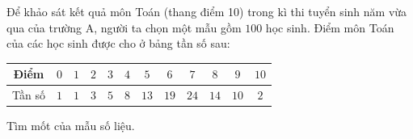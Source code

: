 \begin{ex}
Để khảo sát kết quả môn Toán (thang điểm 10) trong kì thi tuyển sinh năm vừa qua của trường A, người ta chọn một mẫu gồm $100$ học sinh. Điểm môn Toán của các học sinh được cho ở bảng tần số sau:
\begin{center}
\begin{tabular}{|c|c|c|c|c|c|c|c|c|c|c|c|}\hline
Điểm & $0$ & $1$ & $2$ & $3$ & $4$ & $5$ & $6$ & $7$ & $8$ & $9$ & $10$\\\hline
Tần số & $1$ & $1$ & $3$ & $5$ & $8$ & $13$ & $19$ & $24$ & $14$ & $10$ & $2$\\\hline
\end{tabular}
\end{center}
Tìm mốt của mẫu số liệu.
\end{ex}
